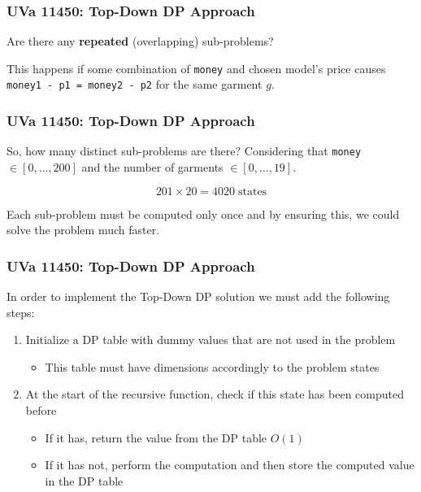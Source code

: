 \documentclass{beamer}
\begin{document}
\begin{frame}[fragile]
\frametitle{UVa 11450: Top-Down DP Approach}

Are there any \textbf{repeated} (overlapping) sub-problems? 

\pause
\vspace{0.3cm}
This happens if some combination of \verb|money| and chosen model’s price causes \verb|money1 - p1 = money2 - p2| for the same garment $g$.

\end{frame}

\begin{frame}[fragile]
\frametitle{UVa 11450: Top-Down DP Approach}

So, how many distinct sub-problems are there? Considering that \verb|money| $\in [0,\ldots,200]$ and the number of garments $\in [0,\ldots,19]$.

\pause 
\vspace{0.3cm}

$$201 \times 20 = 4020 \; \text{states}$$

\pause
\vspace{0.3cm}

\color{blue}Each sub-problem must be computed only once and by ensuring this, we could solve the problem much faster.\color{black}

\end{frame}

\begin{frame}[fragile]
\frametitle{UVa 11450: Top-Down DP Approach}

In order to implement the Top-Down DP solution we must add the following steps:

\begin{enumerate}
    \item \color{blue}Initialize a DP table with dummy values that are not used in the problem\color{black}
    
    \begin{itemize}
        \item This table must have dimensions accordingly to the problem states
    \end{itemize}
    
    \pause
    \item \color{blue}At the start of the recursive function, check if this state has been computed before\color{black}
    	\begin{itemize}
		    \item If it has, return the value from the DP table $O(1)$
		    \item If it has not, perform the computation and then store the computed value in the DP table
		\end{itemize}
\end{enumerate}

\end{frame}
\end{document}
